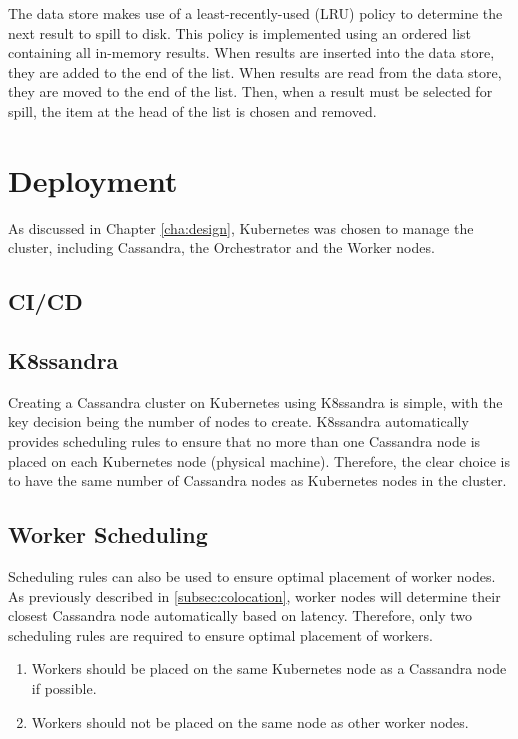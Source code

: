 The data store makes use of a least-recently-used (LRU) policy to determine the next result to spill to disk. This policy is implemented using an ordered list containing all in-memory results. When results are inserted into the data store, they are added to the end of the list. When results are read from the data store, they are moved to the end of the list. Then, when a result must be selected for spill, the item at the head of the list is chosen and removed.

\section{Deployment}
As discussed in Chapter \ref{cha:design}, Kubernetes was chosen to manage the cluster, including Cassandra, the Orchestrator and the Worker nodes.

\subsection{CI/CD}

\subsection{K8ssandra}
Creating a Cassandra cluster on Kubernetes using K8ssandra is simple, with the key decision being the number of nodes to create. K8ssandra automatically provides scheduling rules to ensure that no more than one Cassandra node is placed on each Kubernetes node (physical machine). Therefore, the clear choice is to have the same number of Cassandra nodes as Kubernetes nodes in the cluster.

\subsection{Worker Scheduling}
Scheduling rules can also be used to ensure optimal placement of worker nodes. As previously described in \ref{subsec:colocation}, worker nodes will determine their closest Cassandra node automatically based on latency. Therefore, only two scheduling rules are required to ensure optimal placement of workers.
\begin{enumerate}
	\item Workers should be placed on the same Kubernetes node as a Cassandra node if possible.
	\item Workers should not be placed on the same node as other worker nodes.
\end{enumerate}

